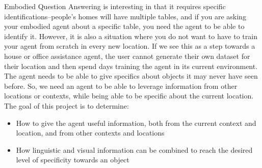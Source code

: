 





Embodied Question Answering is interesting in that it requires specific identifications--people's homes will have multiple tables, and if you are asking your embodied agent about a specific table, you need the agent to be able to identify it. However, it is also a situation where you do not want to have to train your agent from scratch in every new location. If we see this as a step towards a house or office assistance agent, the user cannot generate their own dataset for their location and then spend days training the agent in its current environment. The agent needs to be able to give specifics about objects it may never have seen before. So, we need an agent to be able to leverage information from other locations or contexts, while being able to be specific about the current location. The goal of this project is to determine:
\begin{itemize}
\item How to give the agent useful information, both from the current context and location, and from other contexts and locations
\item How linguistic and visual information can be combined to reach the desired level of specificity towards an object
\end{itemize}
